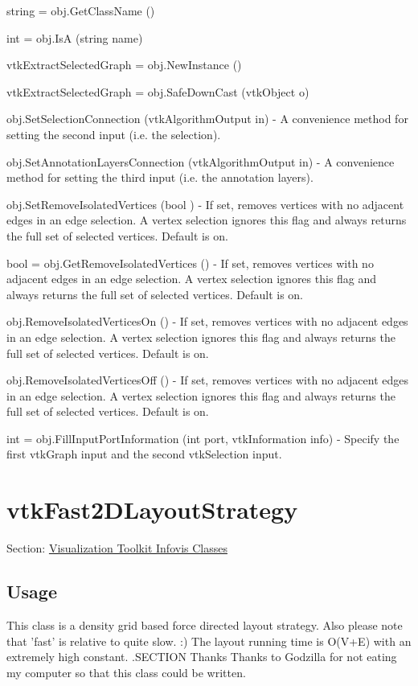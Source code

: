 \begin{DoxyItemize}
\item {\ttfamily string = obj.\-Get\-Class\-Name ()}  
\item {\ttfamily int = obj.\-Is\-A (string name)}  
\item {\ttfamily vtk\-Extract\-Selected\-Graph = obj.\-New\-Instance ()}  
\item {\ttfamily vtk\-Extract\-Selected\-Graph = obj.\-Safe\-Down\-Cast (vtk\-Object o)}  
\item {\ttfamily obj.\-Set\-Selection\-Connection (vtk\-Algorithm\-Output in)} -\/ A convenience method for setting the second input (i.\-e. the selection).  
\item {\ttfamily obj.\-Set\-Annotation\-Layers\-Connection (vtk\-Algorithm\-Output in)} -\/ A convenience method for setting the third input (i.\-e. the annotation layers).  
\item {\ttfamily obj.\-Set\-Remove\-Isolated\-Vertices (bool )} -\/ If set, removes vertices with no adjacent edges in an edge selection. A vertex selection ignores this flag and always returns the full set of selected vertices. Default is on.  
\item {\ttfamily bool = obj.\-Get\-Remove\-Isolated\-Vertices ()} -\/ If set, removes vertices with no adjacent edges in an edge selection. A vertex selection ignores this flag and always returns the full set of selected vertices. Default is on.  
\item {\ttfamily obj.\-Remove\-Isolated\-Vertices\-On ()} -\/ If set, removes vertices with no adjacent edges in an edge selection. A vertex selection ignores this flag and always returns the full set of selected vertices. Default is on.  
\item {\ttfamily obj.\-Remove\-Isolated\-Vertices\-Off ()} -\/ If set, removes vertices with no adjacent edges in an edge selection. A vertex selection ignores this flag and always returns the full set of selected vertices. Default is on.  
\item {\ttfamily int = obj.\-Fill\-Input\-Port\-Information (int port, vtk\-Information info)} -\/ Specify the first vtk\-Graph input and the second vtk\-Selection input.  
\end{DoxyItemize}\hypertarget{vtkinfovis_vtkfast2dlayoutstrategy}{}\section{vtk\-Fast2\-D\-Layout\-Strategy}\label{vtkinfovis_vtkfast2dlayoutstrategy}
Section\-: \hyperlink{sec_vtkinfovis}{Visualization Toolkit Infovis Classes} \hypertarget{vtkwidgets_vtkxyplotwidget_Usage}{}\subsection{Usage}\label{vtkwidgets_vtkxyplotwidget_Usage}
This class is a density grid based force directed layout strategy. Also please note that 'fast' is relative to quite slow. \-:) The layout running time is O(V+\-E) with an extremely high constant. .S\-E\-C\-T\-I\-O\-N Thanks Thanks to Godzilla for not eating my computer so that this class could be written.

